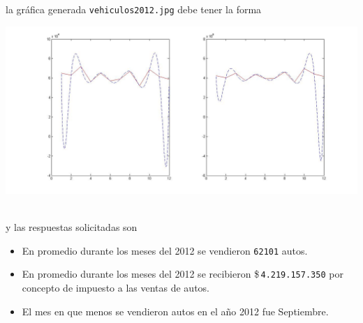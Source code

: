 \documentclass[11pt]{article}
\begin{document}
\begin{enumerate}
la gr\'afica generada \texttt{vehiculos2012.jpg} debe tener la forma
\begin{center}
\includegraphics[width=\textwidth]{./p1.jpg}\,
\end{center}
y las respuestas solicitadas son 

\begin{minipage}{0.8 \textwidth}
\begin{itemize}
\item En promedio durante los meses del 2012 se vendieron 
\texttt{62101}
autos.
\item En promedio durante los meses del 2012 se recibieron 
\$\,\texttt{4.219.157.350} por concepto de impuesto a las ventas de autos.
\item El mes en que menos se vendieron autos en el año 2012 fue Septiembre.
\end{itemize}
\end{minipage}
\,
\end{enumerate}
\end{document}
